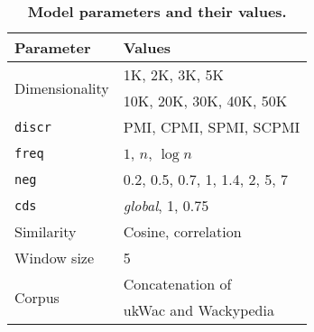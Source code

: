 \begin{table}
  \centering
  \small
  \begin{tabular}{ll}
    \toprule
    Parameter & Values \\
    \midrule
    \multirow{2}{*}{Dimensionality} & 1K, 2K, 3K, 5K \\
                                    & 10K, 20K, 30K, 40K, 50K \\
    \texttt{discr} & PMI, CPMI, SPMI, SCPMI \\
    \texttt{freq} & $1$, $n$, $\log n$ \\
    \texttt{neg} & 0.2, 0.5, 0.7, 1, 1.4, 2, 5, 7 \\
    \texttt{cds} & \textit{global}, 1, 0.75 \\
    Similarity & Cosine, correlation \\
    Window size & 5                                \\
    \multirow{2}{*}{Corpus} & Concatenation of \\
                            & ukWac and Wackypedia \\
    \bottomrule
  \end{tabular}
  \caption{\textbf{Model parameters and their values.}}
\label{tab:parameters}
\end{table}

